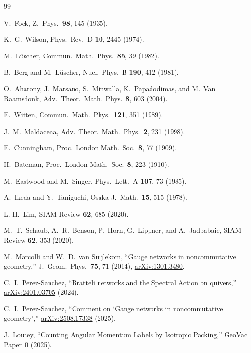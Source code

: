 \documentclass[aps,pra,twocolumn,superscriptaddress,longbibliography]{revtex4-2}
\begin{document}
\begin{thebibliography}{99}

V.~Fock, Z.\ Phys.\ \textbf{98}, 145 (1935).

K.~G.~Wilson, Phys.\ Rev.\ D \textbf{10}, 2445 (1974).

M.~L\"uscher, Commun.\ Math.\ Phys.\ \textbf{85}, 39 (1982).

B.~Berg and M.~L\"uscher, Nucl.\ Phys.\ B \textbf{190}, 412 (1981).

O.~Aharony, J.~Marsano, S.~Minwalla, K.~Papadodimas, and M.~Van
Raamsdonk, Adv.\ Theor.\ Math.\ Phys.\ \textbf{8}, 603 (2004).

E.~Witten, Commun.\ Math.\ Phys.\ \textbf{121}, 351 (1989).

J.~M.~Maldacena, Adv.\ Theor.\ Math.\ Phys.\ \textbf{2}, 231 (1998).

E.~Cunningham, Proc.\ London Math.\ Soc.\ \textbf{8}, 77 (1909).

H.~Bateman, Proc.\ London Math.\ Soc.\ \textbf{8}, 223 (1910).

M.~Eastwood and M.~Singer, Phys.\ Lett.\ A \textbf{107}, 73 (1985).

A.~Ikeda and Y.~Taniguchi, Osaka J.\ Math.\ \textbf{15}, 515 (1978).

L.-H.~Lim, SIAM Review \textbf{62}, 685 (2020).

M.~T.~Schaub, A.~R.~Benson, P.~Horn, G.~Lippner, and A.~Jadbabaie,
SIAM Review \textbf{62}, 353 (2020).

M.~Marcolli and W.~D.~van Suijlekom,
``Gauge networks in noncommutative geometry,''
J.\ Geom.\ Phys.\ \textbf{75}, 71 (2014),
\href{https://arxiv.org/abs/1301.3480}{arXiv:1301.3480}.

C.~I.~Perez-Sanchez,
``Bratteli networks and the Spectral Action on quivers,''
\href{https://arxiv.org/abs/2401.03705}{arXiv:2401.03705} (2024).

C.~I.~Perez-Sanchez,
``Comment on `Gauge networks in noncommutative geometry',''
\href{https://arxiv.org/abs/2508.17338}{arXiv:2508.17338} (2025).

J.~Loutey, ``Counting Angular Momentum Labels by Isotropic Packing,'' GeoVac Paper~0 (2025).


\end{thebibliography}
\end{document}
